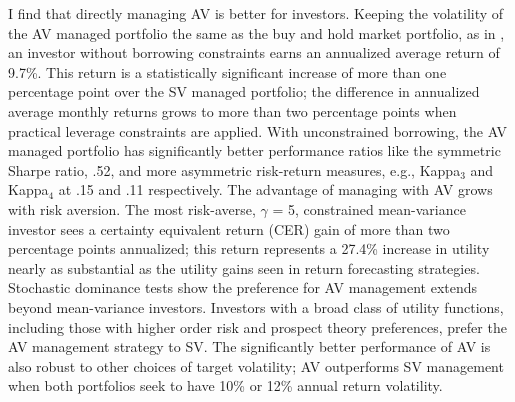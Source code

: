 I find that directly managing AV is better for investors. Keeping the volatility of the AV managed portfolio the same as the buy and hold market portfolio, as in \citet{moreira_volatility-managed_2017}, an investor without borrowing constraints earns an annualized average return of 9.7\%. This return is a statistically significant increase of more than one percentage point over the SV managed portfolio; the difference in annualized average monthly returns grows to more than two percentage points when practical leverage constraints are applied. With unconstrained borrowing, the AV managed portfolio has significantly better performance ratios like the symmetric Sharpe ratio, .52, and more asymmetric risk-return measures, e.g., Kappa$_{3}$ and Kappa$_{4}$ at .15 and .11 respectively. The advantage of managing with AV grows with risk aversion. The most risk-averse, $\gamma$ = 5, constrained mean-variance investor sees a certainty equivalent return (CER) gain of more than two percentage points annualized; this return represents a 27.4\% increase in utility nearly as substantial as the utility gains seen in return forecasting strategies. \citep{campbell1997econometrics} Stochastic dominance tests show the preference for AV management extends beyond mean-variance investors. Investors with a broad class of utility functions, including those with higher order risk and prospect theory preferences, prefer the AV management strategy to SV. 
The significantly better performance of AV is also robust to other choices of target volatility; AV outperforms SV management when both portfolios seek to have 10\% or 12\% annual return volatility. 


